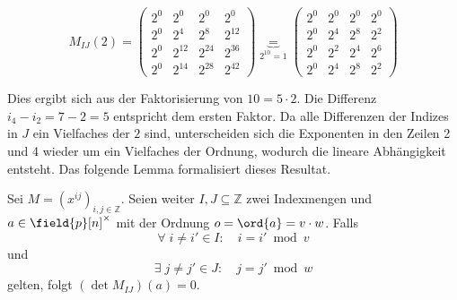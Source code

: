 \begin{equation*}
    M_{IJ}(2) = \begin{pmatrix}
        2^{0} & 2^{0} & 2^{0} & 2^{0} \\
        2^{0} & 2^{4} & 2^{8} & 2^{12} \\
        2^{0} & 2^{12} & 2^{24} & 2^{36} \\
        2^{0} & 2^{14} & 2^{28} & 2^{42} 
    \end{pmatrix} \underbrace{=}_{2^{10}=1} \begin{pmatrix}
        2^{0} & 2^{0} & 2^{0} & 2^{0} \\
        2^{0} & 2^{4} & 2^{8} & 2^{2} \\
        2^{0} & 2^{2} & 2^{4} & 2^{6} \\
        2^{0} & 2^{4} & 2^{8} & 2^{2} 
    \end{pmatrix}
\end{equation*}

Dies ergibt sich aus der Faktorisierung von $10 = 5 \cdot 2$. Die Differenz ${i_4 - i_2 = 7 - 2 = 5}$ entspricht dem ersten Faktor. Da alle Differenzen der Indizes in $J$ ein Vielfaches der $2$ sind, unterscheiden sich die Exponenten in den Zeilen 2 und 4 wieder um ein Vielfaches der Ordnung, wodurch die lineare Abhängigkeit entsteht. Das folgende Lemma formalisiert dieses Resultat.

\begin{lemma} \label{lemma:equal-columns}
    Sei $M = \left( x^{ij} \right)_{i,j \in \mathbb{Z}}$. Seien weiter $I,J \subseteq \mathbb{Z}$ zwei Indexmengen und $a \in \field{p}[n]^\times$ mit der Ordnung $o = \ord{a} = v\cdot w$. Falls
    \begin{equation} \label{equation:all-equal}
        \forall \; i \neq i' \in I: \quad i = i' \bmod v
    \end{equation}
    und
    \begin{equation} \label{equation:two-equal}
        \exists \; j \neq j' \in J: \quad j = j' \bmod w
    \end{equation}
    gelten, folgt $(\det M_{IJ})(a) = 0$.
\end{lemma}

